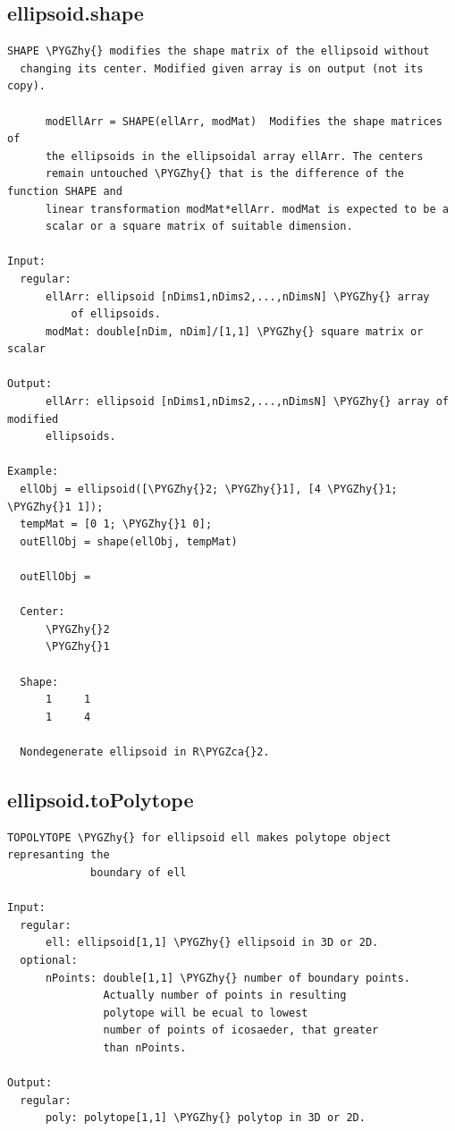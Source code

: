 \documentclass[letterpaper,10pt,english]{sphinxmanual}
\def\PYGZca{\char`\^}
\def\PYGZhy{\char`\-}
\begin{document}
\subsection{ellipsoid.shape}
\label{chap_functions:ellipsoid-shape}
\begin{Verbatim}[commandchars=\\\{\}]
SHAPE \PYGZhy{} modifies the shape matrix of the ellipsoid without
  changing its center. Modified given array is on output (not its copy).

      modEllArr = SHAPE(ellArr, modMat)  Modifies the shape matrices of
      the ellipsoids in the ellipsoidal array ellArr. The centers
      remain untouched \PYGZhy{} that is the difference of the function SHAPE and
      linear transformation modMat*ellArr. modMat is expected to be a
      scalar or a square matrix of suitable dimension.

Input:
  regular:
      ellArr: ellipsoid [nDims1,nDims2,...,nDimsN] \PYGZhy{} array
          of ellipsoids.
      modMat: double[nDim, nDim]/[1,1] \PYGZhy{} square matrix or scalar

Output:
      ellArr: ellipsoid [nDims1,nDims2,...,nDimsN] \PYGZhy{} array of modified
      ellipsoids.

Example:
  ellObj = ellipsoid([\PYGZhy{}2; \PYGZhy{}1], [4 \PYGZhy{}1; \PYGZhy{}1 1]);
  tempMat = [0 1; \PYGZhy{}1 0];
  outEllObj = shape(ellObj, tempMat)

  outEllObj =

  Center:
      \PYGZhy{}2
      \PYGZhy{}1

  Shape:
      1     1
      1     4

  Nondegenerate ellipsoid in R\PYGZca{}2.
\end{Verbatim}


\subsection{ellipsoid.toPolytope}
\label{chap_functions:ellipsoid-topolytope}
\begin{Verbatim}[commandchars=\\\{\}]
TOPOLYTOPE \PYGZhy{} for ellipsoid ell makes polytope object represanting the
             boundary of ell

Input:
  regular:
      ell: ellipsoid[1,1] \PYGZhy{} ellipsoid in 3D or 2D.
  optional:
      nPoints: double[1,1] \PYGZhy{} number of boundary points.
               Actually number of points in resulting
               polytope will be ecual to lowest
               number of points of icosaeder, that greater
               than nPoints.

Output:
  regular:
      poly: polytope[1,1] \PYGZhy{} polytop in 3D or 2D.
\end{Verbatim}
\end{document}
